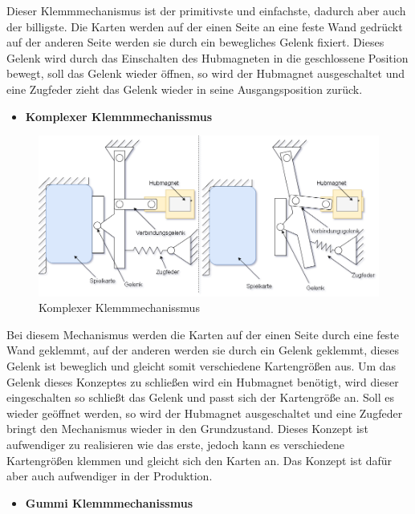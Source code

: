 Dieser Klemmmechanismus ist der primitivste und einfachste, dadurch aber auch der billigste. Die Karten werden auf der einen Seite an eine feste Wand gedrückt
auf der anderen Seite werden sie durch ein bewegliches Gelenk fixiert. Dieses Gelenk wird durch das Einschalten des Hubmagneten in die geschlossene Position bewegt,
soll das Gelenk wieder öffnen, so wird der Hubmagnet ausgeschaltet und eine Zugfeder zieht das Gelenk wieder in seine Ausgangsposition zurück.

\begin{itemize}
    \item \textbf{Komplexer Klemmmechanissmus}
\end{itemize}

\begin{figure}[H]
    \centering
    \includegraphics[scale=0.5,page=1]{fig/mech/Kartenausgabe_2}
    \caption{Komplexer Klemmmechanissmus}
\end{figure}

Bei diesem Mechanismus werden die Karten auf der einen Seite durch eine feste Wand geklemmt, auf der anderen werden sie durch ein Gelenk geklemmt, dieses Gelenk
ist beweglich und gleicht somit verschiedene Kartengrößen aus. Um das Gelenk dieses Konzeptes zu schließen wird ein Hubmagnet benötigt, wird dieser eingeschalten
so schließt das Gelenk und passt sich der Kartengröße an. Soll es wieder geöffnet werden, so wird der Hubmagnet ausgeschaltet und eine Zugfeder bringt den Mechanismus wieder in den
Grundzustand. Dieses Konzept ist aufwendiger zu realisieren wie das erste, jedoch kann es verschiedene Kartengrößen klemmen und gleicht sich den Karten an. Das Konzept ist
dafür aber auch aufwendiger in der Produktion.

\begin{itemize}
    \item \textbf{Gummi Klemmmechanissmus}
\end{itemize}

